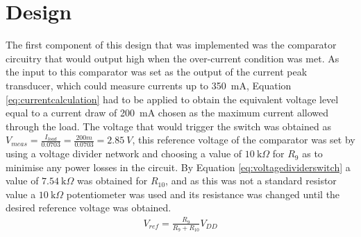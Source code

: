 \section{Design} \label{sec:sw_design}
The first component of this design that was implemented was the comparator circuitry that would output high when the over-current condition was met. As the input to this comparator was set as the output of the current peak transducer, which could measure currents up to \SI{350}{\milli A}, Equation \ref{eq:currentcalculation} had to be applied to obtain the equivalent voltage level equal to a current draw of \SI{200}{\milli A} chosen as the maximum current allowed through the load. The voltage that would trigger the switch was obtained as $V_{meas}=\frac{I_{load}}{0.0703}=\frac{200m}{0.0703}=\SI{2.85}{V}$, this reference voltage of the comparator was set by using a voltage divider network and choosing a value of $\SI{10}{\kilo \Omega}$ for $R_9$ as to minimise any power losses in the circuit. By Equation \ref{eq:voltagedividerswitch} a value of $\SI{7.54}{\kilo \Omega}$ was obtained for $R_{10}$, and as this was not a standard resistor value a $\SI{10}{\kilo \Omega}$ potentiometer was used and its resistance was changed until the desired reference voltage was obtained.
\begin{align}
   V_{ref}=\frac{R_9}{R_9+R_10}V_{DD}
   \label{eq:voltagedividerswitch}
\end{align}
